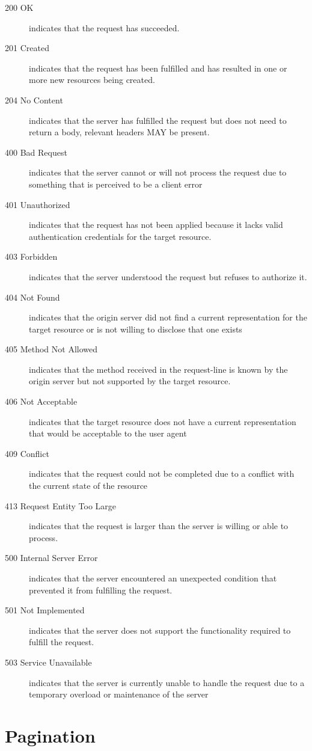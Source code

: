\documentclass[10pt,a4paper]{article}
\begin{document}
\begin{description}
\item[200 OK] indicates that the request has succeeded.
\item[201 Created] indicates that the request has been fulfilled and has resulted in one or more new resources being created.
\item[204 No Content] indicates that the server has fulfilled the request but does not need to return a body, relevant headers MAY be present.
\item[400 Bad Request] indicates that the server cannot or will not process the request due to something that is perceived to be a client error
\item[401 Unauthorized] indicates that the request has not been applied because it lacks valid authentication credentials for the target resource.
\item[403 Forbidden] indicates that the server understood the request but refuses to authorize it.
\item[404 Not Found] indicates that the origin server did not find a current representation for the target resource or is not willing to disclose that one exists
\item[405 Method Not Allowed] indicates that the method received in the request-line is known by the origin server but not supported by the target resource.
\item[406 Not Acceptable] indicates that the target resource does not have a current representation that would be acceptable to the user agent
\item[409 Conflict] indicates that the request could not be completed due to a conflict with the current state of the resource
\item[413 Request Entity Too Large] indicates that the request is larger than the server is willing or able to process.
\item[500 Internal Server Error] indicates that the server encountered an unexpected condition that prevented it from fulfilling the request.
\item[501 Not Implemented] indicates that the server does not support the functionality required to fulfill the request.
\item[503 Service Unavailable] indicates that the server is currently unable to handle the request due to a temporary overload or maintenance of the server
\end{description}

\section{Pagination}
\label{sec:pagin}
\end{document}
